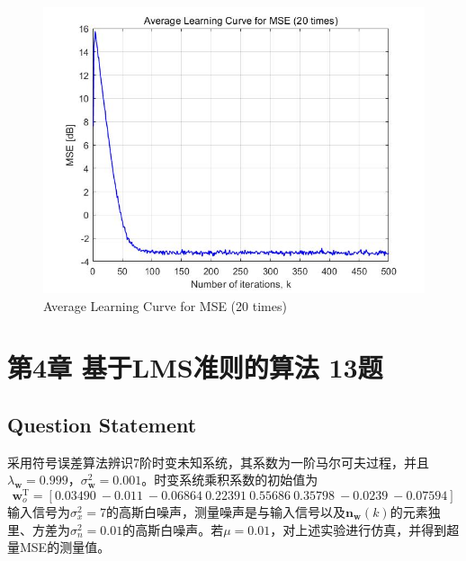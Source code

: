 \documentclass[UTF-8, a4paper, 12pt]{ctexart}
\begin{document}
\begin{figure}[htbp]
    \centering
    \includegraphics[width=14cm]{3.26/average.jpg}
    \caption{Average Learning Curve for MSE (20 times) }
    \label{av}
\end{figure}

\newpage
\section{第4章 基于LMS准则的算法 13题}
\subsection{Question Statement}
采用符号误差算法辨识7阶时变未知系统，其系数为一阶马尔可夫过程，并且$\lambda_{\boldsymbol{w} }=0.999$，$\sigma_{\boldsymbol{w}}^2=0.001$。时变系统乘积系数的初始值为
\begin{equation}
    \boldsymbol{w}_{o}^{\mathrm{T}}=\left[0.03490\ -0.011\ -0.06864\ 0.22391\ 0.55686\ 0.35798\ -0.0239\ -0.07594\right]
\end{equation}
输入信号为$\sigma_x^2=7$的高斯白噪声，测量噪声是与输入信号以及$\boldsymbol{n}_{\boldsymbol{w}}(k)$的元素独里、方差为$\sigma_n^2=0.01$的高斯白噪声。若$\mu=0.01$，对上述实验进行仿真，并得到超量MSE的测量值。
\end{document}
